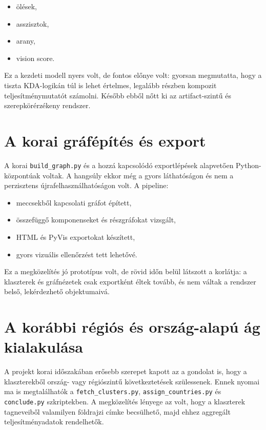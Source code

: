 \documentclass[a4paper,12pt]{report}
\begin{document}
\begin{itemize}
    \item ölések,
    \item asszisztok,
    \item arany,
    \item vision score.
\end{itemize}

Ez a kezdeti modell nyers volt, de fontos előnye volt: gyorsan megmutatta, hogy a tiszta KDA-logikán túl is lehet értelmes, legalább részben kompozit teljesítménymutatót számolni. Később ebből nőtt ki az artifact-szintű és szerepkörérzékeny rendszer.

\section{A korai gráfépítés és export}

A korai \texttt{build\_graph.py} és a hozzá kapcsolódó exportlépések alapvetően Python-központúak voltak. A hangsúly ekkor még a gyors láthatóságon és nem a perzisztens újrafelhasználhatóságon volt. A pipeline:

\begin{itemize}
    \item meccsekből kapcsolati gráfot épített,
    \item összefüggő komponenseket és részgráfokat vizsgált,
    \item HTML és PyVis exportokat készített,
    \item gyors vizuális ellenőrzést tett lehetővé.
\end{itemize}

Ez a megközelítés jó prototípus volt, de rövid időn belül látszott a korlátja: a klaszterek és gráfnézetek csak exportként éltek tovább, és nem váltak a rendszer belső, lekérdezhető objektumaivá.

\section{A korábbi régiós és ország-alapú ág kialakulása}

A projekt korai időszakában erősebb szerepet kapott az a gondolat is, hogy a klaszterekből ország- vagy régiószintű következtetések szülessenek. Ennek nyomai ma is megtalálhatók a \texttt{fetch\_clusters.py}, \texttt{assign\_countries.py} és \texttt{conclude.py} szkriptekben. A megközelítés lényege az volt, hogy a klaszterek tagneveiből valamilyen földrajzi címke becsülhető, majd ehhez aggregált teljesítményadatok rendelhetők.
\end{document}
